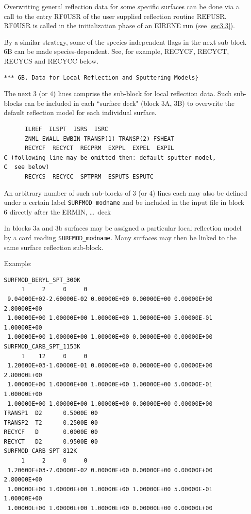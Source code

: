 Overwriting general reflection data for some specific surfaces can be done via
a call to the entry RF0USR of the user supplied reflection routine REFUSR.
RF0USR is called in the initialization phase of an EIRENE run (see
\cref{sec3.3}).

By a similar strategy, some of the species independent flags in the next
sub-block 6B can be made species-dependent.
See, for example, RECYCF, RECYCT, RECYCS and RECYCC below.

\medskip

\begin{lstlisting}
*** 6B. Data for Local Reflection and Sputtering Models}
\end{lstlisting}

\medskip

The next 3 (or 4) lines comprise the sub-block for local reflection data.
Such sub-blocks can be included in each ``surface deck" (block 3A, 3B) to
overwrite the default reflection model for each individual surface.

\begin{lstlisting}
      ILREF  ILSPT  ISRS  ISRC
      ZNML EWALL EWBIN TRANSP(1) TRANSP(2) FSHEAT
      RECYCF  RECYCT  RECPRM  EXPPL  EXPEL  EXPIL
C (following line may be omitted then: default sputter model, 
C  see below)
      RECYCS  RECYCC  SPTPRM  ESPUTS ESPUTC
\end{lstlisting}

\medskip

An arbitrary number of such sub-blocks of 3 (or 4) lines each may also be
defined under a certain label \lstinline|SURFMOD_modname| and be included in the
input file in block 6 directly after the ERMIN, \dots\ deck 

In blocks 3a and 3b surfaces may be assigned a particular local reflection
model by a card reading \lstinline|SURFMOD_modname|.
Many surfaces may then be linked to the same surface reflection sub-block.

Example:

\begin{footnotesize}
  \begin{lstlisting}
SURFMOD_BERYL_SPT_300K
     1     2     0     0
 9.04000E+02-2.60000E-02 0.00000E+00 0.00000E+00 0.00000E+00 2.80000E+00
 1.00000E+00 1.00000E+00 1.00000E+00 1.00000E+00 5.00000E-01 1.00000E+00
 1.00000E+00 1.00000E+00 1.00000E+00 0.00000E+00 0.00000E+00
SURFMOD_CARB_SPT_1153K
     1    12     0     0
 1.20600E+03-1.00000E-01 0.00000E+00 0.00000E+00 0.00000E+00 2.80000E+00
 1.00000E+00 1.00000E+00 1.00000E+00 1.00000E+00 5.00000E-01 1.00000E+00
 1.00000E+00 1.00000E+00 1.00000E+00 0.00000E+00 0.00000E+00
TRANSP1  D2      0.5000E 00
TRANSP2  T2      0.2500E 00
RECYCF   D       0.0000E 00
RECYCT   D2      0.9500E 00
SURFMOD_CARB_SPT_812K
     1     2     0     0
 1.20600E+03-7.00000E-02 0.00000E+00 0.00000E+00 0.00000E+00 2.80000E+00
 1.00000E+00 1.00000E+00 1.00000E+00 1.00000E+00 5.00000E-01 1.00000E+00
 1.00000E+00 1.00000E+00 1.00000E+00 0.00000E+00 0.00000E+00
\end{lstlisting}
\end{footnotesize}

